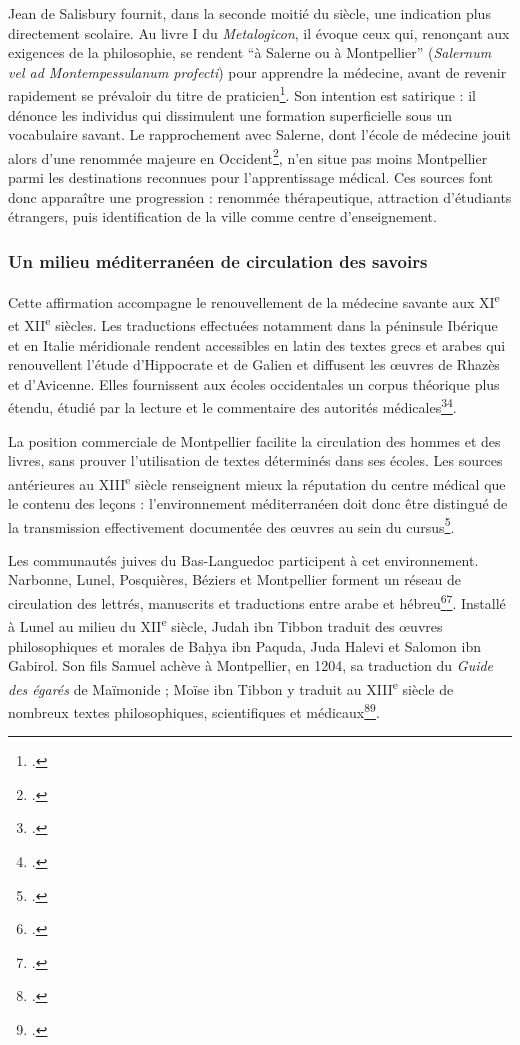 Jean de Salisbury fournit, dans la seconde moitié du siècle, une indication plus directement scolaire. Au livre I du \emph{Metalogicon}, il évoque ceux qui, renonçant aux exigences de la philosophie, se rendent \enquote{à Salerne ou à Montpellier} (\emph{Salernum vel ad Montempessulanum profecti}) pour apprendre la médecine, avant de revenir rapidement se prévaloir du titre de praticien\footcite{JeanSalisburyMetalogicon1929}. Son intention est satirique : il dénonce les individus qui dissimulent une formation superficielle sous un vocabulaire savant. Le rapprochement avec Salerne, dont l'école de médecine jouit alors d'une renommée majeure en Occident\footcite{DeDivitiisEtAl2004}, n'en situe pas moins Montpellier parmi les destinations reconnues pour l'apprentissage médical. Ces sources font donc apparaître une progression : renommée thérapeutique, attraction d'étudiants étrangers, puis identification de la ville comme centre d'enseignement.

\subsubsection{Un milieu méditerranéen de circulation des savoirs}

Cette affirmation accompagne le renouvellement de la médecine savante aux XI\textsuperscript{e} et XII\textsuperscript{e} siècles. Les traductions effectuées notamment dans la péninsule Ibérique et en Italie méridionale rendent accessibles en latin des textes grecs et arabes qui renouvellent l'étude d'Hippocrate et de Galien et diffusent les œuvres de Rhazès et d'Avicenne. Elles fournissent aux écoles occidentales un corpus théorique plus étendu, étudié par la lecture et le commentaire des autorités médicales\footcite{Siraisi1990}\footcite{Moulinier2003Montpellier}.

La position commerciale de Montpellier facilite la circulation des hommes et des livres, sans prouver l'utilisation de textes déterminés dans ses écoles. Les sources antérieures au XIII\textsuperscript{e} siècle renseignent mieux la réputation du centre médical que le contenu des leçons : l'environnement méditerranéen doit donc être distingué de la transmission effectivement documentée des œuvres au sein du cursus\footcite{Touati2018}.

Les communautés juives du Bas-Languedoc participent à cet environnement. Narbonne, Lunel, Posquières, Béziers et Montpellier forment un réseau de circulation des lettrés, manuscrits et traductions entre arabe et hébreu\footcite{Sirat1979}\footcite{Iancu2025}. Installé à Lunel au milieu du XII\textsuperscript{e} siècle, Judah ibn Tibbon traduit des œuvres philosophiques et morales de Baḥya ibn Paquda, Juda Halevi et Salomon ibn Gabirol. Son fils Samuel achève à Montpellier, en 1204, sa traduction du \emph{Guide des égarés} de Maïmonide ; Moïse ibn Tibbon y traduit au XIII\textsuperscript{e} siècle de nombreux textes philosophiques, scientifiques et médicaux\footcite{Sirat1979}\footcite{Dumas2019Flux}.

